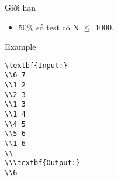 Giới hạn  
\begin{itemize}
	\item     50\% số test có N  $\le$  1000.   
\end{itemize}
   Example  
\begin{verbatim}
\textbf{Input:}
\\6 7
\\1 2
\\2 3
\\1 3
\\1 4
\\4 5
\\5 6
\\1 6
\\
\\\textbf{Output:}
\\6\end{verbatim}